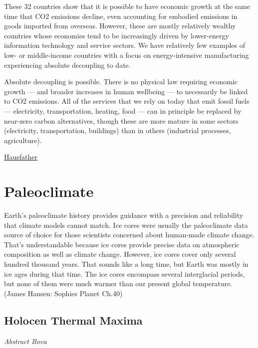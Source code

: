 \documentclass[
]{book}
\begin{document}
These 32 countries show that it is possible to have economic growth at the same time that CO2 emissions decline, even accounting for embodied emissions in goods imported from overseas. However, these are mostly relatively wealthy countries whose economies tend to be increasingly driven by lower-energy information technology and service sectors. We have relatively few examples of low- or middle-income countries with a focus on energy-intensive manufacturing experiencing absolute decoupling to date.

Absolute decoupling is possible. There is no physical law requiring economic growth --- and broader increases in human wellbeing --- to necessarily be linked to CO2 emissions. All of the services that we rely on today that emit fossil fuels --- electricity, transportation, heating, food --- can in principle be replaced by near-zero carbon alternatives, though these are more mature in some sectors (electricity, transportation, buildings) than in others (industrial processes, agriculture).

\href{https://thebreakthrough.org/issues/energy/absolute-decoupling-of-economic-growth-and-emissions-in-32-countries}{Hausfather}

\hypertarget{paleoclimate}{%
\chapter{Paleoclimate}\label{paleoclimate}}

Earth's paleoclimate history provides guidance with a precision and reliability that climate
models cannot match. Ice cores were usually the paleoclimate data source of choice for those
scientists concerned about human-made climate change. That's understandable because ice
cores provide precise data on atmospheric composition as well as climate change.
However, ice cores cover only several hundred thousand years. That sounds like a long time, but
Earth was mostly in ice ages during that time. The ice cores encompass several interglacial
periods, but none of them were much warmer than our present global temperature.
(James Hansen: Sophies Planet Ch.40)

\hypertarget{holocen-thermal-maxima}{%
\section{Holocen Thermal Maxima}\label{holocen-thermal-maxima}}

\emph{Abstract Bova}
\end{document}
